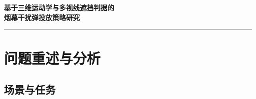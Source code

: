 \documentclass[UTF8,a4paper,zihao=-4]{ctexart}
\newcommand{\result}[1]{\textcolor{Vermilion}{\textbf{#1}}}
\begin{document}
\thispagestyle{plain}
\begin{center}
  \vspace*{-0.5em}
  {\bfseries\sffamily\color{DeepBlue}
  基于三维运动学与多视线遮挡判据的\\[0.25em]
  烟幕干扰弹投放策略研究\par}
  \vspace{0.7em}
  {\color{Gold}\rule{0.30\textwidth}{1.2pt}}
\end{center}

\begin{abstract}
针对无人机投放烟幕干扰弹、遮蔽来袭导弹对真目标视线的问题，本文建立“三维确定性运动学—圆柱目标多视线遮挡—连续时间区间并集—分层混合优化”模型。导弹与无人机采用匀速直线运动，干扰弹采用继承水平速度的无阻力抛体运动，烟幕中心在起爆后以 \(3\,\mathrm{m/s}\) 下沉。真目标保留为半径 \(7\,\mathrm m\)、高 \(10\,\mathrm m\) 的圆柱体；仅当烟幕球同时遮挡导弹至全部确定性代表点的视线时，才计为有效遮蔽。多弹结果按连续时间区间并集计量，避免重叠时间重复累计。

问题一固定方案对 M1 的有效遮蔽时长为 \result{1.362201500 s}。问题二在冻结搜索预算内得到 \result{2.238164377 s}，较问题一增加 \(0.875962877\,\mathrm s\)，相对增幅约 \(64.30\%\)。问题三和问题四的并集时长均为 \result{2.238164377 s}；逐项核验显示额外两枚弹或两架无人机贡献均为 \(0\)，故不作协同增益推断。问题五按严格字典序目标，使用 FY1、FY2、FY5 分别服务 M1、M2、M3，三枚导弹时长为 \result{2.238164377 s、1.982043314 s、1.876800871 s}，总时长为 \result{6.097008562 s}，最短时长为 \result{1.876800871 s}。

冻结结果在三个登记随机种子下逐指标跨度为 \(0\)。最终严格复算与上一档加密配置的最大差为 \(2.04\times10^{-4}\,\mathrm s\)。敏感性结果表明：水平速度继承假设 A03 对当前结果具有决定性影响；地面处理 A07 不改变当前有效区间；将全点判据放宽为 \(80\%\) 覆盖会提高部分指标。全文只报告冻结可行方案及已登记验证范围，不把数值搜索解释为全局最优证明。

\noindent\textbf{关键词：}烟幕干扰弹；三维运动学；视线遮挡；区间并集；差分进化；任务分配
\end{abstract}

\section{问题重述与分析}

\subsection{场景与任务}
\end{document}
